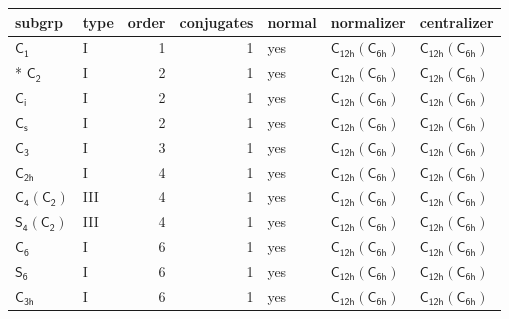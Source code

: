 \documentclass[10pt,a4paper]{article}
\numberwithin{equation}{section}
\newcommand{\grp}[1]{\mathsf{#1}}
\begin{document}
{\small\begin{longtable}{@{}llrrlll@{}}\toprule
subgrp & type & order & conjugates & normal & normalizer & centralizer\\\midrule\endhead
\bottomrule\endfoot\endlastfoot
\href{../../../rotation/data/pdf/C1.pdf}{$\grp{C_{1}}$} & I & 1 & 1 & yes & \href{C12h-C6h.pdf}{$\grp{C_{12h}}(\grp{C_{6h}})$} & \href{C12h-C6h.pdf}{$\grp{C_{12h}}(\grp{C_{6h}})$}\\*
\href{../../../rotation/data/pdf/C2.pdf}{$\grp{C_{2}}$} & I & 2 & 1 & yes & \href{C12h-C6h.pdf}{$\grp{C_{12h}}(\grp{C_{6h}})$} & \href{C12h-C6h.pdf}{$\grp{C_{12h}}(\grp{C_{6h}})$}\\
\href{../../../rotation/data/pdf/S2.pdf}{$\grp{C_{i}}$} & I & 2 & 1 & yes & \href{C12h-C6h.pdf}{$\grp{C_{12h}}(\grp{C_{6h}})$} & \href{C12h-C6h.pdf}{$\grp{C_{12h}}(\grp{C_{6h}})$}\\
\href{../../../rotation/data/pdf/C1v.pdf}{$\grp{C_{s}}$} & I & 2 & 1 & yes & \href{C12h-C6h.pdf}{$\grp{C_{12h}}(\grp{C_{6h}})$} & \href{C12h-C6h.pdf}{$\grp{C_{12h}}(\grp{C_{6h}})$}\\
\href{../../../rotation/data/pdf/C3.pdf}{$\grp{C_{3}}$} & I & 3 & 1 & yes & \href{C12h-C6h.pdf}{$\grp{C_{12h}}(\grp{C_{6h}})$} & \href{C12h-C6h.pdf}{$\grp{C_{12h}}(\grp{C_{6h}})$}\\
\href{../../../rotation/data/pdf/C2h.pdf}{$\grp{C_{2h}}$} & I & 4 & 1 & yes & \href{C12h-C6h.pdf}{$\grp{C_{12h}}(\grp{C_{6h}})$} & \href{C12h-C6h.pdf}{$\grp{C_{12h}}(\grp{C_{6h}})$}\\
\href{C4-C2.pdf}{$\grp{C_{4}}(\grp{C_{2}})$} & III & 4 & 1 & yes & \href{C12h-C6h.pdf}{$\grp{C_{12h}}(\grp{C_{6h}})$} & \href{C12h-C6h.pdf}{$\grp{C_{12h}}(\grp{C_{6h}})$}\\
\href{S4-C2.pdf}{$\grp{S_{4}}(\grp{C_{2}})$} & III & 4 & 1 & yes & \href{C12h-C6h.pdf}{$\grp{C_{12h}}(\grp{C_{6h}})$} & \href{C12h-C6h.pdf}{$\grp{C_{12h}}(\grp{C_{6h}})$}\\
\href{../../../rotation/data/pdf/C6.pdf}{$\grp{C_{6}}$} & I & 6 & 1 & yes & \href{C12h-C6h.pdf}{$\grp{C_{12h}}(\grp{C_{6h}})$} & \href{C12h-C6h.pdf}{$\grp{C_{12h}}(\grp{C_{6h}})$}\\
\href{../../../rotation/data/pdf/S6.pdf}{$\grp{S_{6}}$} & I & 6 & 1 & yes & \href{C12h-C6h.pdf}{$\grp{C_{12h}}(\grp{C_{6h}})$} & \href{C12h-C6h.pdf}{$\grp{C_{12h}}(\grp{C_{6h}})$}\\
\href{../../../rotation/data/pdf/C3h.pdf}{$\grp{C_{3h}}$} & I & 6 & 1 & yes & \href{C12h-C6h.pdf}{$\grp{C_{12h}}(\grp{C_{6h}})$} & \href{C12h-C6h.pdf}{$\grp{C_{12h}}(\grp{C_{6h}})$}\\

\end{longtable}}
\end{document}
